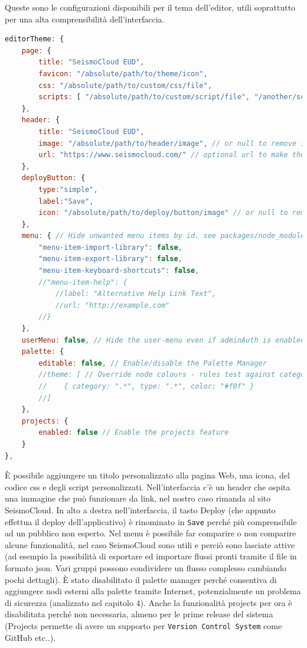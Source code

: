 \documentclass[a4paper,10pt]{memoir}
\begin{document}
Queste sono le configurazioni disponibili per il tema dell'editor, utili soprattutto per una alta comprensibilità dell'interfaccia.
\begin{lstlisting}[language=Javascript]
editorTheme: {
    page: {
        title: "SeismoCloud EUD",
        favicon: "/absolute/path/to/theme/icon",
        css: "/absolute/path/to/custom/css/file",
        scripts: [ "/absolute/path/to/custom/script/file", "/another/script/file"]
    },
    header: {
        title: "SeismoCloud EUD",
        image: "/absolute/path/to/header/image", // or null to remove image
        url: "https://www.seismocloud.com/" // optional url to make the header text/image a link to this url
    },
    deployButton: {
        type:"simple",
        label:"Save",
        icon: "/absolute/path/to/deploy/button/image" // or null to remove image
    },
    menu: { // Hide unwanted menu items by id. see packages/node_modules/@node-red/editor-client/src/js/red.js:loadEditor for complete list
        "menu-item-import-library": false,
        "menu-item-export-library": false,
        "menu-item-keyboard-shortcuts": false,
        //"menu-item-help": {
            //label: "Alternative Help Link Text",
            //url: "http://example.com"
        //}
    },
    userMenu: false, // Hide the user-menu even if adminAuth is enabled
    palette: {
        editable: false, // Enable/disable the Palette Manager
        //theme: [ // Override node colours - rules test against category/type by RegExp.
        //    { category: ".*", type: ".*", color: "#f0f" }
        //]
    },
    projects: {
        enabled: false // Enable the projects feature
    }
},
\end{lstlisting}
È possibile aggiungere un titolo personalizzato alla pagina Web, una icona, del codice css e degli script personalizzati.
Nell'interfaccia c'è un header che ospita una immagine che può funzionare da link, nel nostro caso rimanda al sito SeismoCloud.
In alto a destra nell'interfaccia, il tasto Deploy (che appunto effettua il deploy dell'applicativo) è rinominato in \texttt{Save} perché più comprensibile ad un pubblico non esperto.
Nel menu è possibile far comparire o non comparire alcune funzionalità, nel caso SeismoCloud sono utili e perciò sono lasciate attive (ad esempio la possibilità di esportare ed importare flussi pronti tramite il file in formato json. Vari gruppi possono condividere un flusso complesso cambiando pochi dettagli). 
È stato disabilitato il palette manager perché consentiva di aggiungere nodi esterni alla palette tramite Internet, potenzialmente un problema di sicurezza (analizzato nel capitolo 4).
Anche la funzionalità projects per ora è disabilitata perché non necessaria, almeno per le prime release del sistema (Projects permette di avere un supporto per \texttt{Version Control System} come GitHub etc..).
\end{document}
